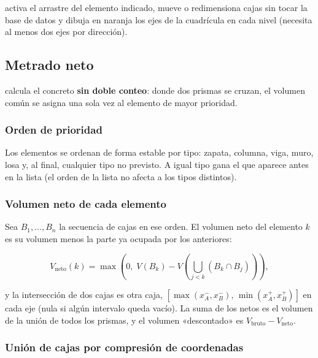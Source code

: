  activa el arrastre del elemento indicado,
 mueve o redimensiona cajas sin tocar la base de datos y
 dibuja en naranja los ejes de la cuadrícula en cada nivel (necesita al menos dos
ejes por dirección).

\subsection{Metrado neto}
\label{sec:mod-metrado}

 calcula el concreto \textbf{sin doble conteo}: donde dos prismas se cruzan, el volumen común
se asigna una sola vez al elemento de mayor prioridad.

\subsubsection{Orden de prioridad}

Los elementos se ordenan de forma estable por tipo: zapata, columna, viga, muro, losa y, al final, cualquier tipo no
previsto. A igual tipo gana el que aparece antes en la lista (el orden de la lista no afecta a los tipos distintos).

\subsubsection{Volumen neto de cada elemento}

Sea $B_1, \dots, B_n$ la secuencia de cajas en ese orden. El volumen neto del elemento $k$ es su volumen menos la
parte ya ocupada por los anteriores:

\begin{equation}
	V_{\text{neto}}(k) = \max\!\left(0,\; V(B_k) - V\!\left( \bigcup_{j<k} \left( B_k \cap B_j \right) \right)\right),
	\label{eq:mod-neto}
\end{equation}

\noindent y la intersección de dos cajas es otra caja, $[\max(x^-_A, x^-_B),\, \min(x^+_A, x^+_B)]$ en cada eje (nula
si algún intervalo queda vacío). La suma de los netos es el volumen de la unión de todos los prismas, y el volumen
«descontado» es $V_{\text{bruto}} - V_{\text{neto}}$.

\subsubsection{Unión de cajas por compresión de coordenadas}

